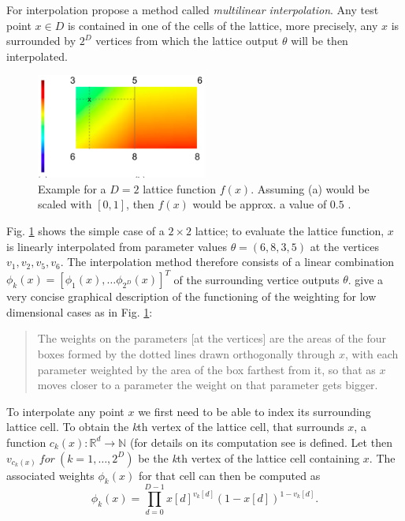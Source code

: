 For interpolation \citep{garcia2009lattice} propose a method called \textit{multilinear interpolation}. Any test point $x \in D$ is contained in one of the cells of the lattice, more precisely, any $x$ is surrounded by $2^D$ vertices from which the lattice output $\theta$ will be then interpolated.
\begin{figure}[htb!]
	\centering
	\includegraphics[width=0.5\textwidth]{img/interpol} %
	\caption{Example for a $D = 2$ lattice function $f(x)$. Assuming (a) would be scaled with $[0, 1]$, then $f(x)$ would be approx. a value of $0.5$ \citep{gupta2016monotonic}.}
	\label{Fig:int}
\end{figure}
 Fig. \ref{Fig:int} shows the simple case of a $2 \times 2$ lattice; to evaluate the lattice function, $x$ is linearly interpolated from parameter values $\theta = (6, 8, 3, 5)$ at the vertices $v_1, v_2, v_5, v_6$. The interpolation method therefore consists of a linear combination $\phi_k(x) = [\phi_1(x), \dots \phi_{2^D}(x)]^T$ of the surrounding vertice outputs $\theta$. \citep[p.~3]{gupta2016monotonic} give a very concise graphical description of the functioning of the weighting for low dimensional cases as in Fig. \ref{Fig:int}: \begin{quote} \small
	The weights on the parameters [at the vertices] are the areas of the four boxes formed by the dotted lines drawn orthogonally through $x$, with each parameter weighted by the area of the box farthest from it, so that as $x$ moves closer to a parameter the weight on that parameter gets bigger.
\end{quote} 
To interpolate any point $x$ we first need to be able to index its surrounding lattice cell. To obtain the \textit{k}th vertex of the lattice cell, that surrounds $x$, a function $c_k(x): \mathbb{R}^{d} \rightarrow \mathbb{N}$ (for details on its computation see \citep{garcia2012optimized} is defined.  Let then $v_{c_k(x)}\ for\ (k = 1, \dots, 2^D)$ be the \textit{k}th vertex of the lattice cell containing $x$. The associated weights $\phi_k(x)$ for that cell can then be computed as
\begin{equation}
\phi_k(x) = \prod_{d=0}^{D-1} x[d]^{v_k[d]}(1- x[d])^{1-v_k[d]}.
\label{Eq:latregint}
\end{equation}
